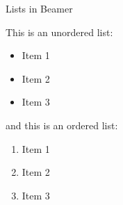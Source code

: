 \documentclass[../main.tex]{subfiles}
\begin{document}
    
 \begin{frame}{Lists in Beamer}

    This is an unordered list:
    \begin{itemize}
        \item Item 1
        \item Item 2
        \item Item 3
    \end{itemize}
    
    and this is an ordered list:
    \begin{enumerate}
        \item Item 1
        \item Item 2
        \item Item 3
    \end{enumerate}
    
    \end{frame}

 
\end{document}
